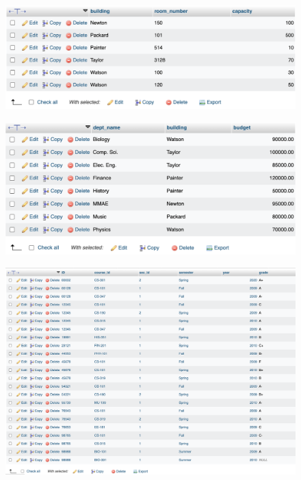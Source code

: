 \documentclass[12pt]{article}
\begin{document}
\vspace{3cm}

\begin{figure}[!hbt]
    \centering
    \includegraphics[scale=0.65]{screenshots/7 3 classroom.png}
    \label{fig:my_label1}
\end{figure}

\newpage

\begin{figure}[!hbt]
    \centering
    \includegraphics[scale=0.62]{screenshots/7 3 department.png}
    \label{fig:my_label1}
\end{figure}

\begin{figure}[!hbt]
    \centering
    \includegraphics[scale=0.45]{screenshots/7 3 takes.png}
    \label{fig:my_label1}
\end{figure}
\end{document}

